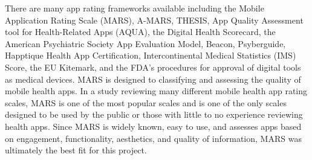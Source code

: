 There are many app rating frameworks available including the Mobile Application Rating Scale (MARS), A-MARS, THESIS, App Quality Assessment tool for Health-Related Apps (AQUA), the Digital Health Scorecard, the American Psychiatric Society App Evaluation Model, Beacon, Psyberguide, Happtique Health App Certification, Intercontinental Medical Statistics (IMS) Score, the EU Kitemark, and the FDA’s procedures for approval of digital tools as medical devices\cite{Morley2024}. MARS is designed to classifying and assessing the quality of mobile health apps\cite{Stoyanov2015}. In a study reviewing many different mobile health app rating scales, MARS is one of the most popular scales and is one of the only scales designed to be used by the public or those with little to no experience reviewing health apps\cite{AzadKhaneghah2020}. Since MARS is widely known, easy to use, and assesses apps based on engagement, functionality, aesthetics, and quality of information, MARS was ultimately the best fit for this project.

